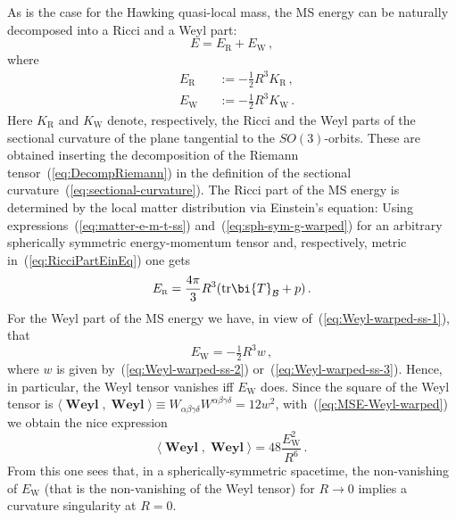 \documentclass
[rmp,aps,twocolumn,showpacs,preprintnumbers,amsmath,amssymb]{revtex4}
\theoremstyle{plain}
\theoremstyle{definition}
\theoremstyle{remark}
\newcommand{\sss}{\scriptscriptstyle}
\newcommand{\ind}[1]{{\sss \text{#1}}}        %
\newcommand{\br}[1]{\mathbf{#1}}              %
\newcommand{\tr}{\mathrm{tr}}                 %
\newcommand{\sprod}[2]{\langle#1,#2\rangle}   %
\DeclareMathOperator{\Weyl}{\br{Weyl}}        %
\newcommand{\B}{\mathcal{B}}                      %
\newcommand{\bT}{\bi{T}}
\begin{document}
As is the case for the Hawking quasi-local mass, the MS energy can be 
naturally decomposed into a Ricci and a Weyl part: 
%
\begin{equation}\label{eq:MSE-sum}
  E = E_\ind{R} + E_\ind{W} \,,
\end{equation}
%
where 
%
\begin{subequations}\label{eq:MSE-decomposition}
\begin{alignat}{3}
\label{eq:MSE-Ricci}
  &E_\ind{R} &&:= -\tfrac{1}{2}R^3 K_\ind{R} \,, \\
\label{eq:MSE-Weyl}
  &E_\ind{W} &&:= -\tfrac{1}{2}R^3 K_\ind{W} \,.
\end{alignat}
\end{subequations}
%
Here $K_\ind{R}$ and $K_\ind{W}$ denote, respectively, the Ricci and 
the Weyl parts of the sectional curvature of the plane tangential to 
the $SO(3)$-orbits. These are obtained inserting the decomposition of 
the Riemann tensor~(\ref{eq:DecompRiemann}) in the definition of the 
sectional curvature~(\ref{eq:sectional-curvature}). 
The Ricci part of the MS energy is determined by the local matter distribution 
via Einstein's equation: Using expressions~(\ref{eq:matter-e-m-t-ss}) 
and~(\ref{eq:sph-sym-g-warped}) for an arbitrary spherically symmetric 
energy-momentum tensor and, respectively, metric 
in~(\ref{eq:RicciPartEinEq}) one gets
%
\begin{equation}\label{eq:MSE-RicciWithEinstein}
  E_\ind{R} = \frac{4\pi}{3}R^3(\tr\bT_\B+p) \,.
\end{equation}
%
For the Weyl part of the MS energy we have, in view 
of~(\ref{eq:Weyl-warped-ss-1}), that
%
\begin{equation}\label{eq:MSE-Weyl-warped}
  E_\ind{W} = -\tfrac{1}{2}R^3 w \,,
\end{equation}
%
where $w$ is given by~(\ref{eq:Weyl-warped-ss-2}) 
or~(\ref{eq:Weyl-warped-ss-3}). Hence, in particular, the Weyl 
tensor vanishes iff $E_\ind{W}$ does. Since the square of the Weyl 
tensor is $\sprod{\Weyl}{\Weyl} 
\equiv W_{\alpha\beta\gamma\delta}W^{\alpha\beta\gamma\delta} =12 w^2$, 
with~(\ref{eq:MSE-Weyl-warped}) we obtain the nice expression 
%
\begin{equation}\label{eq:Weyl-square-MSE}
  \sprod{\Weyl}{\Weyl} = 48 \frac{E_\ind{W}^2}{R^6} \,.
\end{equation}
%
From this one sees that, in a spherically-symmetric spacetime, the 
non-vanishing of $E_\ind{W}$ (that is the non-vanishing of the Weyl tensor) 
for $R\to 0$ implies a curvature singularity at $R=0$. 
\end{document}
